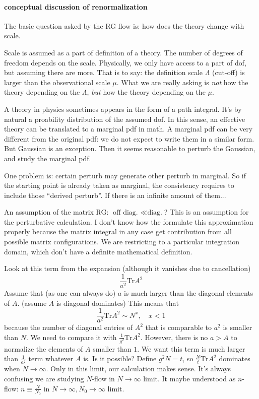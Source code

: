 



\newpage

\paragraph{conceptual discussion of renormalization}
The basic question asked by the RG flow is:
how does the theory change with scale.

Scale is assumed as a part of definition of a theory.
The number of degrees of freedom depends on the scale.
Physically, we only have access to a part of dof,
but assuming there are more.
That is to say: the definition scale $\Lambda$ (cut-off)
is larger than the observational scale $\mu$.
What we are really asking is \emph{not} how the theory depending
on the $\Lambda$,
\emph{but} how the theory depending on the $\mu$.

A theory in physics sometimes appears in the form of a path integral.
It's by natural a proability distribution of the assumed dof.
In this sense, an effective theory can be translated to a marginal pdf in math.
A marginal pdf can be very different from the original pdf:
we do not expect to write them in a similar form.
But Gaussian is an exception.
Then it seems reasonable to perturb the Gaussian,
and study the marginal pdf.

One problem is: certain perturb may generate other perturb in marginal.
So if the starting point is already taken as marginal,
the consistency requires to include those ``derived perturb''.
If there is an infinite amount of them...

\begin{problem}
	An assumption of the matrix RG: $\text{off diag. } \ll \text{diag.}$?
	This is an assumption for the perturbative calculation.
	I don't know how the formulate this approximation properly
	because the matrix integral in any case get contribution from
	all possible matrix configurations.
	We are restricting to a particular integration domain,
	which don't have a definite mathematical definition.
\end{problem}

\begin{problem}
	Look at this term from the expansion (although it vanishes due to cancellation)
	\[
	\frac{1}{a^2}\mathrm{Tr}A^2
	\] 
Assume that (as one can always do) $a$ is much larger than the diagonal elements of $A$.
(assume $A$ is diagonal dominates)
This means that
\[
	\frac{1}{a^2} \mathrm{Tr} A^2 \sim N^x,\quad x<1
\] 
because the number of diagonal entries of $A^2$ that is comparable to $a^2$ is smaller than $N$.
We need to compare it with $\frac{1}{g^2}\mathrm{Tr}A^2$.
However, there is no $a>A$ to normalize the elements of $A$ smaller than $1$.
We want this term is much larger than $\frac{1}{a^2}$ term whatever $A$ is.
Is it possible? Define $g^2 N = t$, so $\frac{N}{t}\mathrm{Tr}A^2$ dominates when $N\to\infty$.
Only in this limit, our calculation makes sense.
It's always confusing we are studying $N$-flow in $N\to\infty$ limit.
It maybe understood as $n$-flow: $n\equiv \frac{N}{N_0}$ in $N\to\infty,N_0\to\infty$ limit.
\end{problem}
